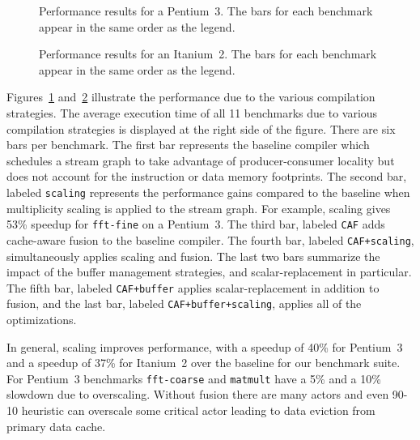 

\begin{figure}[t]
  \vspace{-24pt}
  \hspace{-0.3in}
  \vspace{-48pt}
  \caption{Performance results for a Pentium~3.  The bars for each
  benchmark appear in the same order as the legend.}
  \label{fig:results-p3}
  \vspace{-6pt}
\end{figure}

\begin{figure}[t]
  \vspace{-36pt}
  \hspace{-0.3in}
  \vspace{-48pt}
  \caption{Performance results for an Itanium~2.  The bars for each
  benchmark appear in the same order as the legend.}
  \label{fig:results-ipf}
  \vspace{-12pt}
\end{figure}

Figures~\ref{fig:results-p3} and~\ref{fig:results-ipf} illustrate the
performance due to the various compilation strategies. The average 
execution time of all 11 benchmarks due to various compilation strategies 
is displayed at the right side of the figure. There are six bars per 
benchmark. The first bar represents the baseline compiler which
schedules a stream graph to take advantage of producer-consumer
locality but does not account for the instruction or data memory
footprints. The second bar, labeled {\tt scaling} represents the
performance gains compared to the baseline when multiplicity scaling
is applied to the stream graph. For example, scaling gives 53\%
speedup for \texttt{fft-fine} on a Pentium~3. The third bar, 
labeled {\tt CAF} adds cache-aware fusion to the baseline compiler. The fourth
bar, labeled \texttt{CAF+scaling}, simultaneously applies scaling and
fusion. The last two bars summarize the impact of the buffer
management strategies, and scalar-replacement in particular. 
The fifth bar, labeled \texttt{CAF+buffer}
applies scalar-replacement in addition to fusion, and the last bar,
labeled \texttt{CAF+buffer+scaling}, applies all of the optimizations.

In general, scaling improves performance, with a speedup of 
40\% for Pentium~3 and a speedup of 37\% for Itanium~2 over the baseline
for our benchmark suite. For Pentium~3 benchmarks \texttt{fft-coarse} and 
\texttt{matmult} have a 5\% and a 10\% slowdown due to overscaling. 
Without fusion there are many actors and even 90-10 heuristic can 
overscale some critical actor leading to data eviction from primary 
data cache.

